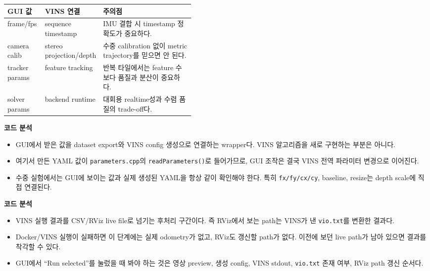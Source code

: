 \documentclass[11pt,a4paper]{article}
\newcommand{\code}[1]{\texttt{#1}}
\newcommand{\codeheading}[1]{\par\vspace{6pt}\noindent{\footnotesize\bfseries\textcolor{codeemph}{#1}}\par\vspace{2pt}}
\newcommand{\readpoint}[1]{\par\noindent{\footnotesize\textcolor{muted}{읽는 포인트: #1}}\par\vspace{2pt}}
\newenvironment{codeanalysis}{%
  \par\vspace{2pt}\noindent
  {\footnotesize\bfseries\textcolor{accentblue}{코드 분석}}\par
  \begin{itemize}[leftmargin=1.35em,topsep=2pt,itemsep=1pt,parsep=0pt]
  \footnotesize
}{%
  \end{itemize}
  \vspace{6pt}
}
\begin{document}
\small
\begin{tabularx}{\linewidth}{p{0.20\linewidth}p{0.24\linewidth}Y}
\toprule
\textbf{GUI 값} & \textbf{VINS 연결} & \textbf{주의점} \\
\midrule
frame/fps & sequence timestamp & IMU 결합 시 timestamp 정확도가 중요하다. \\
camera calib & stereo projection/depth & 수중 calibration 없이 metric trajectory를 믿으면 안 된다. \\
tracker params & feature tracking & 반복 타일에서는 feature 수보다 품질과 분산이 중요하다. \\
solver params & backend runtime & 대회용 realtime성과 수렴 품질의 trade-off다. \\
\bottomrule
\end{tabularx}
\normalsize

\readpoint{GUI는 알고리즘 자체가 아니라 dataset/config/run wrapper다.}
\codeheading{web\_gui.py:658--736}

\begin{codeanalysis}
  \item GUI에서 받은 값을 dataset export와 VINS config 생성으로 연결하는 wrapper다. VINS 알고리즘을 새로 구현하는 부분은 아니다.
  \item 여기서 만든 YAML 값이 \code{parameters.cpp}의 \code{readParameters()}로 들어가므로, GUI 조작은 결국 VINS 전역 파라미터 변경으로 이어진다.
  \item 수중 실험에서는 GUI에 보이는 값과 실제 생성된 YAML을 항상 같이 확인해야 한다. 특히 \code{fx/fy/cx/cy}, baseline, resize는 depth scale에 직접 연결된다.
\end{codeanalysis}

\codeheading{web\_gui.py:750--775}

\begin{codeanalysis}
  \item VINS 실행 결과를 CSV/RViz live file로 넘기는 후처리 구간이다. 즉 RViz에서 보는 path는 VINS가 낸 \code{vio.txt}를 변환한 결과다.
  \item Docker/VINS 실행이 실패하면 이 단계에는 실제 odometry가 없고, RViz도 갱신할 path가 없다. 이전에 보던 live path가 남아 있으면 결과를 착각할 수 있다.
  \item GUI에서 ``Run selected''를 눌렀을 때 봐야 하는 것은 영상 preview, 생성 config, VINS stdout, \code{vio.txt} 존재 여부, RViz path 갱신 순서다.
\end{codeanalysis}
\end{document}
